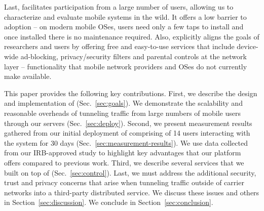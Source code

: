 Last, \meddle facilitates participation from a large number of users, allowing 
us to characterize and evaluate mobile systems in the wild. It offers a low barrier to adoption -- 
on modern mobile OSes, users need only a few taps to install \meddle and 
once installed there is no maintenance required. Also, \meddle explicitly aligns the goals of researchers 
and users by offering free and easy-to-use services that include device-wide
ad-blocking, privacy/security filters and parental controls at the
network layer -- functionality that mobile network providers and OSes do not
currently make available. 

This paper provides the following key contributions. First, we describe the 
design and implementation of \meddle (Sec.~\ref{sec:goals}). We demonstrate the scalability and reasonable overheads of 
tunneling traffic from large numbers of mobile users through our servers (Sec.~\ref{sec:deploy}). 
Second, we present measurement results gathered from our initial deployment of \meddle  
comprising of 14 users interacting with the system for 30 days (Sec.~\ref{sec:measurement-results}). We use data collected from 
our IRB-approved study to highlight key advantages that our platform 
offers compared to previous work. Third, we describe several 
services that we built on top of \meddle (Sec.~\ref{sec:control}). Last, we must address the
additional security, trust and privacy concerns that arise when
tunneling traffic outside of carrier networks into a third-party
distributed service. We discuss these issues and others in
Section~\ref{sec:discussion}. We conclude in Section~\ref{sec:conclusion}.


